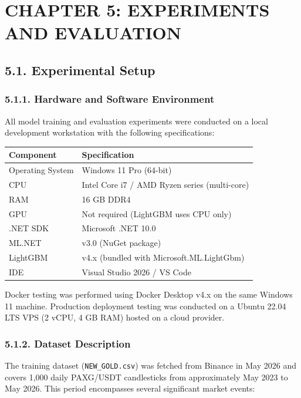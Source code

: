 \section{CHAPTER 5: EXPERIMENTS AND EVALUATION}

\subsection{5.1. Experimental Setup}

\subsubsection{5.1.1. Hardware and Software Environment}
All model training and evaluation experiments were conducted on a local development workstation with the following specifications:

\begin{center}
\begin{tabular}{|l|l|}
\hline
\textbf{Component} & \textbf{Specification}\\
\hline
Operating System & Windows 11 Pro (64-bit)\\
CPU & Intel Core i7 / AMD Ryzen series (multi-core)\\
RAM & 16 GB DDR4\\
GPU & Not required (LightGBM uses CPU only)\\
.NET SDK & Microsoft .NET 10.0\\
ML.NET & v3.0 (NuGet package)\\
LightGBM & v4.x (bundled with Microsoft.ML.LightGbm)\\
IDE & Visual Studio 2026 / VS Code\\
\hline
\end{tabular}
\end{center}

Docker testing was performed using Docker Desktop v4.x on the same Windows 11 machine. Production deployment testing was conducted on a Ubuntu 22.04 LTS VPS (2 vCPU, 4 GB RAM) hosted on a cloud provider.

\subsubsection{5.1.2. Dataset Description}
The training dataset (\texttt{NEW\_GOLD.csv}) was fetched from Binance in May 2026 and covers 1,000 daily PAXG/USDT candlesticks from approximately May 2023 to May 2026. This period encompasses several significant market events:

